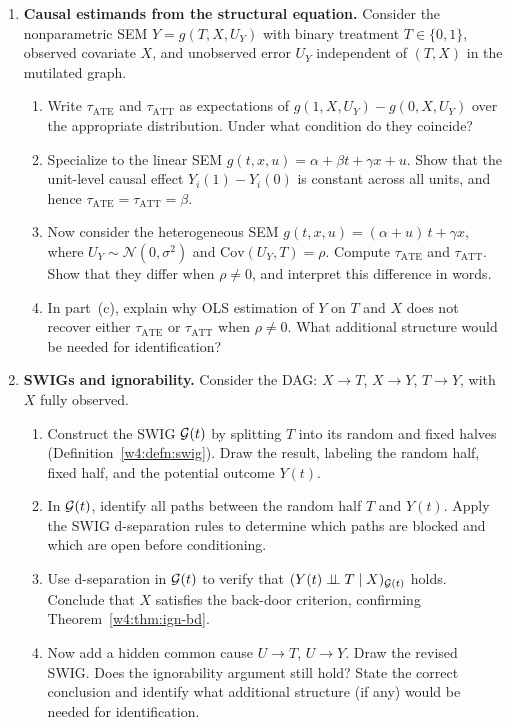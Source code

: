 \documentclass[master.tex]{subfiles}
\begin{document}
\begin{enumerate}[label=\textbf{\arabic*.}, leftmargin=*, itemsep=10pt]
  \item \textbf{Causal estimands from the structural equation.}
  Consider the nonparametric SEM $Y = g(T, X, U_Y)$ with binary treatment
  $T \in \{0,1\}$, observed covariate $X$, and unobserved error $U_Y$
  independent of $(T, X)$ in the mutilated graph.
  \begin{enumerate}[label=(\alph*)]
    \item Write $\tau_{\mathrm{ATE}}$ and $\tau_{\mathrm{ATT}}$ as
          expectations of $g(1, X, U_Y) - g(0, X, U_Y)$ over the
          appropriate distribution.  Under what condition do they coincide?
    \item Specialize to the linear SEM $g(t, x, u) = \alpha + \beta t
          + \gamma x + u$.  Show that the unit-level causal effect
          $Y_i(1) - Y_i(0)$ is constant across all units, and hence
          $\tau_{\mathrm{ATE}} = \tau_{\mathrm{ATT}} = \beta$.
    \item Now consider the heterogeneous SEM $g(t, x, u) = (\alpha + u)\,t
          + \gamma x$, where $U_Y \sim \mathcal{N}(0, \sigma^2)$ and
          $\mathrm{Cov}(U_Y, T) = \rho$.  Compute $\tau_{\mathrm{ATE}}$
          and $\tau_{\mathrm{ATT}}$.  Show that they differ when $\rho \neq 0$,
          and interpret this difference in words.
    \item In part~(c), explain why OLS estimation of $Y$ on $T$ and $X$
          does not recover either $\tau_{\mathrm{ATE}}$ or
          $\tau_{\mathrm{ATT}}$ when $\rho \neq 0$.  What additional
          structure would be needed for identification?
  \end{enumerate}

  \item \textbf{SWIGs and ignorability.}
  Consider the DAG: $X \to T$, $X \to Y$, $T \to Y$, with $X$ fully
  observed.
  \begin{enumerate}[label=(\alph*)]
    \item Construct the SWIG $\mathcal{G}(t)$ by splitting $T$ into its random
          and fixed halves (Definition~\ref{w4:defn:swig}).  Draw the result,
          labeling the random half, fixed half, and the potential outcome $Y(t)$.
    \item In $\mathcal{G}(t)$, identify all paths between the random half $T$
          and $Y(t)$.  Apply the SWIG d-separation rules to determine
          which paths are blocked and which are open before conditioning.
    \item Use d-separation in $\mathcal{G}(t)$ to verify that
          $(Y(t) \perp\!\!\!\perp T \mid X)_{\mathcal{G}(t)}$ holds.  Conclude that $X$
          satisfies the back-door criterion, confirming
          Theorem~\ref{w4:thm:ign-bd}.
    \item Now add a hidden common cause $U \to T$, $U \to Y$.  Draw the
          revised SWIG.  Does the ignorability argument still hold?
          State the correct conclusion and identify what additional
          structure (if any) would be needed for identification.
  \end{enumerate}

\end{enumerate}
\end{document}

